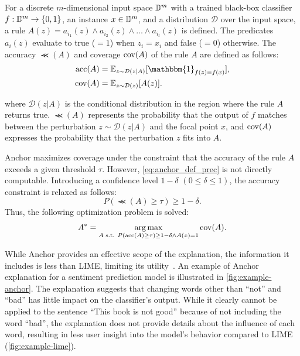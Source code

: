 \documentclass[runningheads]{llncs}
\begin{document}
For a discrete $m$-dimensional input space $\mathbb{D}^{m}$
with a trained black-box classifier $f: \mathbb{D}^{m} \to \{0,1\}$,
an instance $x \in \mathbb{D}^{m}$,
and a distribution $\mathcal{D}$ over the input space,
a rule $A(z) = a_{i_1}(z) \wedge a_{i_2}(z) \wedge \dots \wedge a_{i_t}(z)$ is defined.
The predicates $a_i(z)$ evaluate to true ($=1$) when $z_i = x_i$ and false ($=0$) otherwise.
The accuracy $\Prec(A)$ and coverage $\operatorname{cov}(A)$ of the rule $A$ are defined as follows:
\begin{align}
	\Prec(A) & =\mathbb{E}_{z\sim\mathcal{D}(z|A)}
	[\mathbbm{1}_{f(z)=f(x)}], \label{eq:anchor_def_prec} \\
	\Cov(A)  & =\mathbb{E}_{z\sim\mathcal{D}(z)}[A(z)].
\end{align}

where $\mathcal{D}(z|A)$ is the conditional distribution in the region
where the rule $A$ returns true.
$\Prec(A)$ represents the probability that the output of $f$ matches
between the perturbation $z\sim\mathcal{D}(z|A)$ and the focal point $x$,
and $\operatorname{cov}(A)$ expresses the probability that the perturbation $z$ fits into $A$.

Anchor maximizes coverage under the constraint that
the accuracy of the rule $A$ exceeds a given threshold $\tau$.
However, \cref{eq:anchor_def_prec} is not directly computable.
Introducing a confidence level $1-\delta$ $(0\le\delta\le1)$,
the accuracy constraint is relaxed as follows:
\begin{equation}
	\label{eq:const_prec}
	P(\Prec(A)\ge\tau)\ge1-\delta.
\end{equation}
Thus, the following optimization problem is solved:
\begin{equation}
	\label{eq:main_problem}
	A^*=\underset{A \text{~s.t. } P(\operatorname{acc}(A)\ge\tau)\ge1-\delta\wedge A(x)=1}
	{\arg\max}\operatorname{cov}(A).
\end{equation}

While Anchor provides an effective scope of the explanation,
the information it includes is less than LIME,
limiting its utility~\cite{ribeiro2018anchors}.
An example of Anchor explanation for a sentiment prediction model
is illustrated in \cref{fig:example-anchor}.
The explanation suggests that changing words other than ``not'' and ``bad''
has little impact on the classifier's output.
While it clearly cannot be applied to the sentence ``This book is not good''
because of not including the word ``bad'',
the explanation does not provide details about the influence of each word,
resulting in less user insight into the model's behavior compared to LIME
(\cref{fig:example-lime}).
\end{document}
